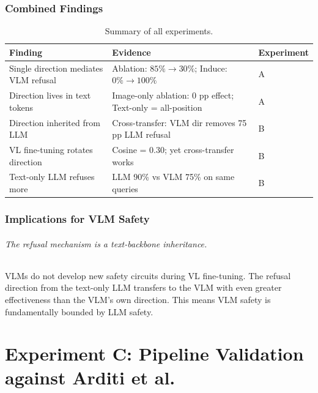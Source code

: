 \documentclass[11pt,a4paper]{article}
\begin{document}
\section{Combined Findings}

\begin{table}[H]\centering
\caption{Summary of all experiments.}
\begin{tabular}{p{4cm}p{4cm}p{4cm}}
\toprule
\textbf{Finding} & \textbf{Evidence} & \textbf{Experiment} \\
\midrule
Single direction mediates VLM refusal & Ablation: $85\% \to 30\%$; Induce: $0\% \to 100\%$ & A \\
Direction lives in text tokens & Image-only ablation: 0 pp effect; Text-only = all-position & A \\
Direction inherited from LLM & Cross-transfer: VLM dir removes 75 pp LLM refusal & B \\
VL fine-tuning rotates direction & Cosine = 0.30; yet cross-transfer works & B \\
Text-only LLM refuses more & LLM 90\% vs VLM 75\% on same queries & B \\
\bottomrule
\end{tabular}
\end{table}

\section{Implications for VLM Safety}

\paragraph{The refusal mechanism is a text-backbone inheritance.} VLMs do not develop new safety circuits during VL fine-tuning. The refusal direction from the text-only LLM transfers to the VLM with even greater effectiveness than the VLM's own direction. This means VLM safety is fundamentally bounded by LLM safety.


\part{Experiment C: Pipeline Validation against Arditi et al.}
\label{part:expC}
\end{document}
